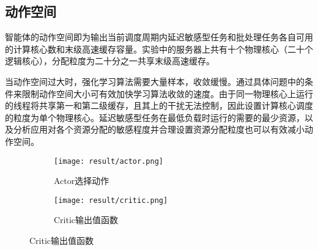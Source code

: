 

\subsection{动作空间}
智能体的动作空间即为输出当前调度周期内延迟敏感型任务和批处理任务各自可用的计算核心数和末级高速缓存容量。实验中的服务器上共有十个物理核心（二十个逻辑核心），分配粒度为二十分之一共享末级高速缓存。

当动作空间过大时，强化学习算法需要大量样本，收敛缓慢。通过具体问题中的条件来限制动作空间大小可有效加快学习算法收敛的速度。由于同一物理核心上运行的线程将共享第一和第二级缓存，且其上的干扰无法控制，因此设置计算核心调度的粒度为单个物理核心。延迟敏感型任务在最低负载时运行的需要的最少资源，以及分析应用对各个资源分配的敏感程度并合理设置资源分配粒度也可以有效减小动作空间。
\begin{figure}[!h]
  \centering
  \begin{subfigure}{0.47\textwidth}
    \centering
    \texttt{[image: result/actor.png]}
    \caption{Actor选择动作}
  \end{subfigure}
  \begin{subfigure}{0.49\textwidth}
    \centering
    \texttt{[image: result/critic.png]}
    \caption{Critic输出值函数}
  \end{subfigure}
  \label{fig:actor_critic}
\end{figure}

